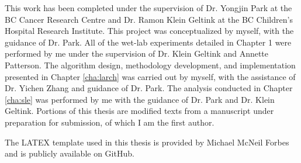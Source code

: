 This work has been completed under the supervision of Dr. Yongjin Park at the BC Cancer Research Centre and Dr. Ramon Klein Geltink at the BC Children's Hospital Research Institute. This project was conceptualized by myself, with the guidance of Dr. Park. 
All of the wet-lab experiments detailed in Chapter 1 were performed by me under the supervision of Dr. Klein Geltink and Annette Patterson.
The algorithm design, methodology development, and implementation presented in Chapter \ref{cha:larch} was carried out by myself, with the assistance of Dr. Yichen Zhang and guidance of Dr. Park.
The analysis conducted in Chapter \ref{cha:sle} was performed by me with the guidance of Dr. Park and Dr. Klein Geltink.
Portions of this thesis are modified texts from a manuscript under preparation for submission, of which I am the first author. 

The LATEX template used in this thesis is provided by Michael McNeil Forbes and is publicly available on GitHub.